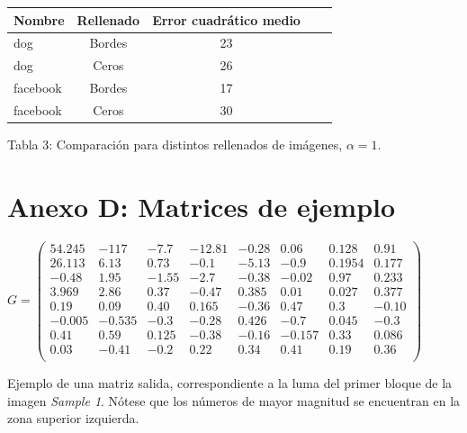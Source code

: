 \documentclass[%
final,
%
reprint,
%
notitlepage,
narroweqnarray,
inline,
twoside,
invited
]{ieee}
\begin{document}
\begin{center}
	\begin{tabular}{|l || c | c | c | c|}
		\hline
		\textbf{Nombre} & \textbf{Rellenado} & \textbf{Error cuadrático medio}\\
		\hline
		\hline
		dog & Bordes &  23\\
		dog & Ceros & 26\\
		facebook & Bordes & 17\\
		facebook & Ceros & 30\\
		\hline
	\end{tabular}
\end{center}
\begin{center}
Tabla 3: Comparación para distintos rellenados de imágenes, $\alpha=1$.
\end{center}

\section*{Anexo D: Matrices de ejemplo}

\begin{center}
\( G = 
\begin{pmatrix}

54.245 & -117 & -7.7 & -12.81 & -0.28 & 0.06 & 0.128 & 0.91 \\
26.113 & 6.13 & 0.73 & -0.1 & -5.13 & -0.9 & 0.1954 & 0.177 \\
-0.48 & 1.95 & -1.55 & -2.7 & -0.38 & -0.02 & 0.97 & 0.233 \\ 
3.969 & 2.86 & 0.37 & -0.47 & 0.385 & 0.01 & 0.027 & 0.377 \\ 
0.19 & 0.09 & 0.40 & 0.165 & -0.36 & 0.47 & 0.3 & -0.10 \\
-0.005 & -0.535 & -0.3 & -0.28 & 0.426 & -0.7 & 0.045 & -0.3 \\
0.41 & 0.59 & 0.125 & -0.38 & -0.16 & -0.157 & 0.33 & 0.086 \\
0.03 & -0.41 & -0.2 & 0.22 & 0.34 & 0.41 & 0.19 & 0.36 \\
\end{pmatrix}\)
\end{center}
\begin{center}
\par Ejemplo de una matriz salida, correspondiente a la luma del primer bloque de la imagen \textit{Sample 1}. Nótese 
que los números de mayor magnitud se encuentran en la zona superior izquierda.
\end{center}
\end{document}
